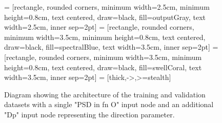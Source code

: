 \documentclass[review]{elsarticle}
\begin{document}
\begin{figure}[!htbh]
\usetikzlibrary{shapes.geometric, arrows}
 = [rectangle, rounded corners, minimum width=2.5cm, minimum height=0.8cm, text centered, draw=black, fill=outputGray, text width=2.5cm, inner sep=2pt]
 = [rectangle, rounded corners, minimum width=3.5cm, minimum height=0.8cm, text centered, draw=black, fill=spectralBlue, text width=3.5cm, inner sep=2pt]
 = [rectangle, rounded corners, minimum width=3.5cm, minimum height=0.8cm, text centered, draw=black, fill=swellCoral, text width=3.5cm, inner sep=2pt]
 = [thick,->,>=stealth]

\caption{Diagram showing the architecture of the training and validation datasets with a single "PSD in fn O" input node and an additional "Dp" input node representing the direction parameter.}
\label{fig:NNTrainingDiagram}
\end{figure}
\end{document}
